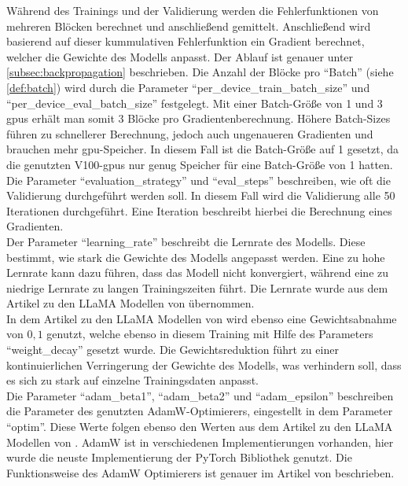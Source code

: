 Während des Trainings und der Validierung werden die Fehlerfunktionen von mehreren Blöcken berechnet und anschließend gemittelt.
Anschließend wird basierend auf dieser kummulativen Fehlerfunktion ein Gradient berechnet, welcher die Gewichte des Modells anpasst.
Der Ablauf ist genauer unter \cref{subsec:backpropagation} beschrieben.
Die Anzahl der Blöcke pro \enquote{Batch} (siehe \cref{def:batch}) wird durch die Parameter \enquote{per\_device\_train\_batch\_size} und \enquote{per\_device\_eval\_batch\_size} festgelegt.
Mit einer Batch-Größe von 1 und 3 \ac{gpu}s erhält man somit 3 Blöcke pro Gradientenberechnung.
Höhere Batch-Sizes führen zu schnellerer Berechnung, jedoch auch ungenaueren Gradienten und brauchen mehr \ac{gpu}-Speicher.
In diesem Fall ist die Batch-Größe auf 1 gesetzt, da die genutzten V100-\ac{gpu}s nur genug Speicher für eine Batch-Größe von 1 hatten.\\

Die Parameter \enquote{evaluation\_strategy} und \enquote{eval\_steps} beschreiben, wie oft die Validierung durchgeführt werden soll.
In diesem Fall wird die Validierung alle 50 Iterationen durchgeführt.
Eine Iteration beschreibt hierbei die Berechnung eines Gradienten.\\

Der Parameter \enquote{learning\_rate} beschreibt die Lernrate des Modells.
Diese bestimmt, wie stark die Gewichte des Modells angepasst werden.
Eine zu hohe Lernrate kann dazu führen, dass das Modell nicht konvergiert, während eine zu niedrige Lernrate zu langen Trainingszeiten führt.
Die Lernrate wurde aus dem Artikel zu den LLaMA Modellen von \citet{llama} übernommen.\\

In dem Artikel zu den LLaMA Modellen von \citet{llama} wird ebenso eine Gewichtsabnahme von $0,1$ genutzt, welche ebenso in diesem Training mit Hilfe des Parameters \enquote{weight\_decay} gesetzt wurde.
Die Gewichtsreduktion führt zu einer kontinuierlichen Verringerung der Gewichte des Modells, was verhindern soll, dass es sich zu stark auf einzelne Trainingsdaten anpasst.\\

Die Parameter \enquote{adam\_beta1}, \enquote{adam\_beta2} und \enquote{adam\_epsilon} beschreiben die Parameter des genutzten AdamW-Optimierers, eingestellt in dem Parameter \enquote{optim}.
Diese Werte folgen ebenso den Werten aus dem Artikel zu den LLaMA Modellen von \citet{llama}.
AdamW ist in verschiedenen Implementierungen vorhanden, hier wurde die neuste Implementierung der PyTorch Bibliothek genutzt.
Die Funktionsweise des AdamW Optimierers ist genauer im Artikel von \citet{adamw} beschrieben.\\

